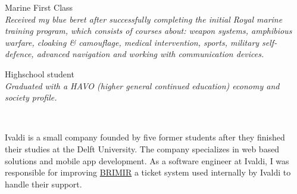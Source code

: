 {{\normalsize\normalfont

\SmallSep


{Marine First Class}
\footnotesize\textit{\\
  Received my blue beret after successfully completing the initial Royal marine
  training program, which consists of courses about: weapon systems, amphibious
  warfare, cloaking \& camouflage, medical intervention, sports, military
  self-defence, advanced navigation and working with communication devices.
}

\normalsize\normalfont

\SmallSep


{Highschool student}
\footnotesize\textit{\\
  Graduated with a HAVO (higher general continued education) economy and
  society profile.
}

\normalsize\normalfont

\SmallSep


\Sep


~\CVSection{\raisebox{.2em}{Experience}}


{
  Ivaldi is a small company founded by five former students after they finished
  their studies at the Delft University. The company specializes in web based
  solutions and mobile app development. As a software engineer at Ivaldi, I was
  responsible for improving \href{https://getbrimir.com}{BRIMIR} a ticket
  system used internally by Ivaldi to handle their support.

  \SmallSep

}}}
